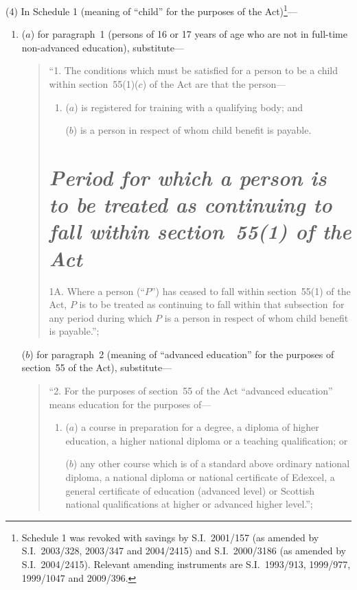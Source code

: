 \documentclass[12pt,a4paper]{article}
\begin{document}
(4) In Schedule 1 (meaning of “child” for the purposes of the Act)\footnote{Schedule 1 was revoked with savings by S.I.~2001/157 (as amended by S.I.~2003/328, 2003/347 and 2004/2415) and S.I.~2000/3186 (as amended by S.I.~2004/2415). Relevant amending instruments are S.I.~1993/913, 1999/977, 1999/1047 and 2009/396.}—
\begin{enumerate}\item[]
($a$) for paragraph~1 (persons of 16 or 17 years of age who are not in full-time non-advanced education), substitute—
\begin{quotation}
“1.  The conditions which must be satisfied for a person to be a child within section~55(1)($c$)  of the Act are that the person—
\begin{enumerate}\item[]
($a$) is registered for training with a qualifying body; and

($b$) is a person in respect of whom child benefit is payable.
\end{enumerate}

\section*{\itshape Period for which a person is to be treated as continuing to fall within section~55(1) of the Act}

1A.  Where a person (“$P$”) has ceased to fall within section~55(1) of the Act, $P$ is to be treated as continuing to fall within that subsection~for any period during which $P$ is a person in respect of whom child benefit is payable.”;
\end{quotation}

($b$) for paragraph~2 (meaning of “advanced education” for the purposes of section~55 of the Act), substitute—
\begin{quotation}
“2.  For the purposes of section~55 of the Act “advanced education” means education for the purposes of—
\begin{enumerate}\item[]
($a$) a course in preparation for a degree, a diploma of higher education, a higher national diploma or a teaching qualification; or

($b$) any other course which is of a standard above ordinary national diploma, a national diploma or national certificate of Edexcel, a general certificate of education (advanced level) or Scottish national qualifications at higher or advanced higher level.”;
\end{enumerate}
\end{quotation}


\end{enumerate}
\end{document}
